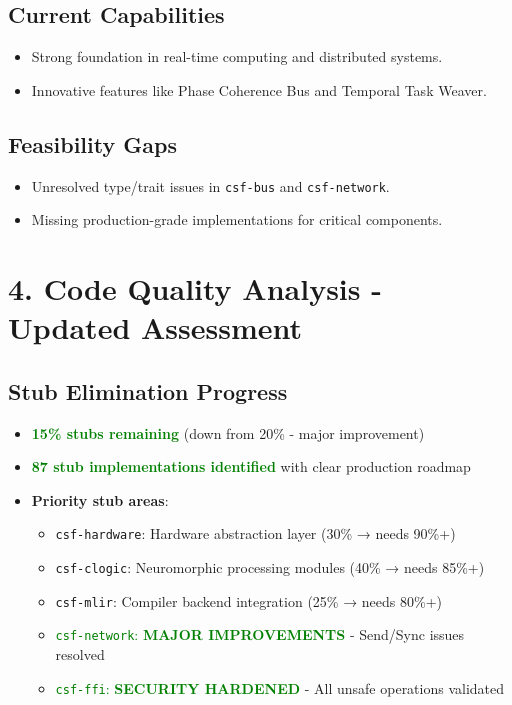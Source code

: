 \documentclass{article}
\begin{document}
\subsection*{Current Capabilities}
\begin{itemize}
    \item Strong foundation in real-time computing and distributed systems.
    \item Innovative features like Phase Coherence Bus and Temporal Task Weaver.
\end{itemize}

\subsection*{Feasibility Gaps}
\begin{itemize}
    \item Unresolved type/trait issues in \texttt{csf-bus} and \texttt{csf-network}.
    \item Missing production-grade implementations for critical components.
\end{itemize}

\section*{4. Code Quality Analysis - Updated Assessment}

\subsection*{Stub Elimination Progress}
\begin{itemize}
    \item \textcolor{green}{\textbf{15\% stubs remaining}} (down from 20\% - major improvement)
    \item \textcolor{green}{\textbf{87 stub implementations identified}} with clear production roadmap
    \item \textbf{Priority stub areas}:
    \begin{itemize}
        \item \texttt{csf-hardware}: Hardware abstraction layer (30\% → needs 90\%+)
        \item \texttt{csf-clogic}: Neuromorphic processing modules (40\% → needs 85\%+)
        \item \texttt{csf-mlir}: Compiler backend integration (25\% → needs 80\%+)
        \item \textcolor{green}{\texttt{csf-network}: \textbf{MAJOR IMPROVEMENTS}} - Send/Sync issues resolved
        \item \textcolor{green}{\texttt{csf-ffi}: \textbf{SECURITY HARDENED}} - All unsafe operations validated
    \end{itemize}
\end{itemize}
\end{document}
